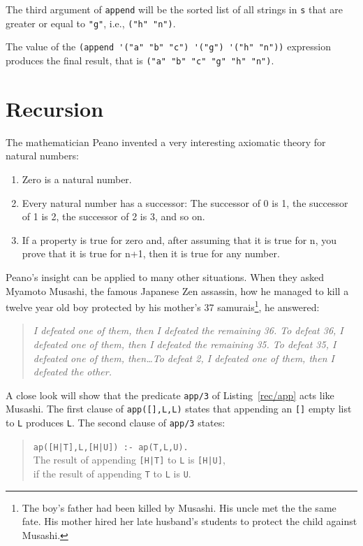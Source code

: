 \documentclass[a4paper,12pt]{book}
\begin{document}
The third argument of \verb|append| will
be the sorted list of all strings in \verb|s|
that are greater or equal to \verb|"g"|,
i.e., \verb|("h" "n")|.

The value of the \verb|(append '("a" "b" "c") '("g") '("h" "n"))|
expression produces the final result, that is
\verb|("a" "b" "c" "g" "h" "n")|.

\chapter{Recursion}\label{chapter:Recursion}
The mathematician Peano invented a very interesting axiomatic theory for
natural numbers:
\begin{enumerate}
\item Zero is a natural number.
\item Every natural number has a successor: The successor
      of 0 is 1, the successor of 1 is 2, the successor
      of 2 is 3, and so on.
\item If a property is true for zero and, after assuming
	that it is true for n, you prove that it is true
	for n+1, then it is true for any number.
\end{enumerate}
Peano's insight can be applied to many other situations.
When they asked Myamoto Musashi, the famous Japanese Zen
assassin, how he managed to kill a twelve year old boy
protected by his mother's 37 samurais\footnote{The boy's
father had been killed by Musashi. His uncle met the the
same fate. His mother hired her late husband's students
to protect the child against Musashi.}, he answered:
\begin{quote}\em
I defeated one of them, then I defeated the remaining 36.
To defeat 36, I defeated one of them, then I defeated
the remaining 35. To defeat 35, I defeated one of them,
then\ldots To defeat 2, I defeated one of them, then
I defeated the other.
\end{quote}
A close look will show that the predicate \verb|app/3|
 of
Listing~\ref{rec/app} acts like Musashi. The first
clause of \verb|app([],L,L)| states that appending
an \verb|[]| empty list to \verb|L| produces \verb|L|.
The second  clause of \verb|app/3|  states:
\begin{quote}
  \verb/ap([H|T],L,[H|U]) :- ap(T,L,U)./\\
  The result of appending \verb/[H|T]/ to \verb|L|
  is \verb/[H|U]/,\\ if the result of appending
  \verb|T| to \verb|L| is \verb|U|.
\end{quote}
\end{document}
